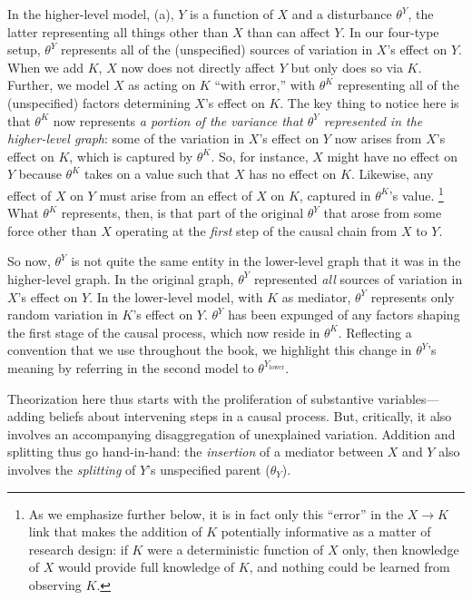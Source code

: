 \documentclass[12pt,]{book}
\let\rmarkdownfootnote\footnote%
\def\footnote{\protect\rmarkdownfootnote}
\begin{document}
In the higher-level model, (a), \(Y\) is a function of \(X\) and a disturbance \(\theta^Y\), the latter representing all things other than \(X\) than can affect \(Y\). In our four-type setup, \(\theta^Y\) represents all of the (unspecified) sources of variation in \(X\)'s effect on \(Y\). When we add \(K\), \(X\) now does not directly affect \(Y\) but only does so via \(K\). Further, we model \(X\) as acting on \(K\) ``with error,'' with \(\theta^K\) representing all of the (unspecified) factors determining \(X\)'s effect on \(K\). The key thing to notice here is that \(\theta^K\) now represents \emph{a portion of the variance that \(\theta^Y\) represented in the higher-level graph}: some of the variation in \(X\)'s effect on \(Y\) now arises from \(X\)'s effect on \(K\), which is captured by \(\theta^K\). So, for instance, \(X\) might have no effect on \(Y\) because \(\theta^K\) takes on a value such that \(X\) has no effect on \(K\). Likewise, any effect of \(X\) on \(Y\) must arise from an effect of \(X\) on \(K\), captured in \(\theta^K\)'s value. \footnote{As we emphasize further below, it is in fact only this ``error'' in the \(X\rightarrow K\) link that makes the addition of \(K\) potentially informative as a matter of research design: if \(K\) were a deterministic function of \(X\) only, then knowledge of \(X\) would provide full knowledge of \(K\), and nothing could be learned from observing \(K\).} What \(\theta^K\) represents, then, is that part of the original \(\theta^Y\) that arose from some force other than \(X\) operating at the \emph{first} step of the causal chain from \(X\) to \(Y\).

So now, \(\theta^Y\) is not quite the same entity in the lower-level graph that it was in the higher-level graph. In the original graph, \(\theta^Y\) represented \emph{all} sources of variation in \(X\)'s effect on \(Y\). In the lower-level model, with \(K\) as mediator, \(\theta^Y\) represents only random variation in \(K\)'s effect on \(Y\). \(\theta^Y\) has been expunged of any factors shaping the first stage of the causal process, which now reside in \(\theta^K\). Reflecting a convention that we use throughout the book, we highlight this change in \(\theta^Y\)'s meaning by referring in the second model to \(\theta^{Y_\text{lower}}\).

Theorization here thus starts with the proliferation of substantive variables---adding beliefs about intervening steps in a causal process. But, critically, it also involves an accompanying disaggregation of unexplained variation. Addition and splitting thus go hand-in-hand: the \emph{insertion} of a mediator between \(X\) and \(Y\) also involves the \emph{splitting} of \(Y\)'s unspecified parent (\(\theta_Y\)).
\end{document}

